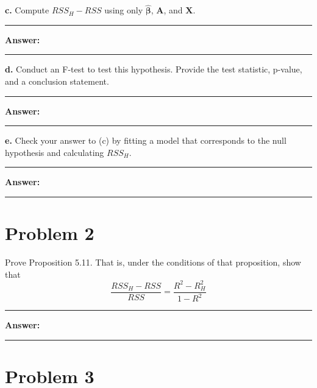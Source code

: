 \documentclass[
]{article}
\newcommand{\bmA}{\ensuremath{\bm A}}
\newcommand{\bmX}{\ensuremath{\bm X}}
\newcommand{\bmbeta}{\ensuremath{\bm{\beta}}}
\newcommand{\bbh}{\ensuremath{\hat{\bmbeta}}}
\begin{document}
\textbf{c.} Compute \(RSS_H - RSS\) using only \(\bbh\), \(\bmA\), and
\(\bmX\).

\begin{center}\rule{0.5\linewidth}{0.5pt}\end{center}

\textbf{Answer:}

\begin{center}\rule{0.5\linewidth}{0.5pt}\end{center}

\textbf{d.} Conduct an F-test to test this hypothesis. Provide the test
statistic, p-value, and a conclusion statement.

\begin{center}\rule{0.5\linewidth}{0.5pt}\end{center}

\textbf{Answer:}

\begin{center}\rule{0.5\linewidth}{0.5pt}\end{center}

\textbf{e.} Check your answer to (c) by fitting a model that corresponds
to the null hypothesis and calculating \(RSS_H\).

\begin{center}\rule{0.5\linewidth}{0.5pt}\end{center}

\textbf{Answer:}

\begin{center}\rule{0.5\linewidth}{0.5pt}\end{center}

\hypertarget{problem-2}{%
\section{Problem 2}\label{problem-2}}

Prove Proposition 5.11. That is, under the conditions of that
proposition, show that
\[\frac{RSS_H - RSS}{RSS} = \frac{R^2 - R^2_H}{1 - R^2}\]

\begin{center}\rule{0.5\linewidth}{0.5pt}\end{center}

\textbf{Answer:}

\begin{center}\rule{0.5\linewidth}{0.5pt}\end{center}

\hypertarget{problem-3}{%
\section{Problem 3}\label{problem-3}}
\end{document}
